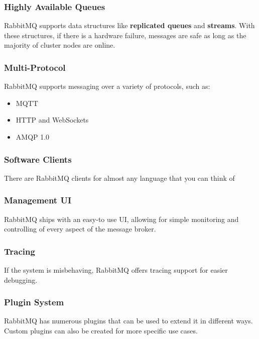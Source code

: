 \documentclass{article}
\begin{document}
\subsubsection{Highly Available Queues}

RabbitMQ supports data structures like \textbf{replicated queues} and \textbf{streams}. With these structures, if there is a hardware failure, messages are safe as long as the majority of cluster nodes are online.

\subsubsection{Multi-Protocol}

RabbitMQ supports messaging over a variety of protocols, such as:

\begin{itemize}
    \item MQTT
    \item HTTP and WebSockets
    \item AMQP 1.0
\end{itemize}

\subsubsection{Software Clients}

There are RabbitMQ clients for almost any language that you can think of

\subsubsection{Management UI}

RabbitMQ ships with an easy-to use UI, allowing for simple monitoring and controlling of every aspect of the message broker.

\subsubsection{Tracing}

If the system is misbehaving, RabbitMQ offers tracing support for easier debugging.

\subsubsection{Plugin System}

RabbitMQ has numerous plugins that can be used to extend it in different ways. 
Custom plugins can also be created for more specific use cases.
\end{document}

